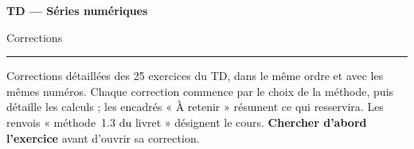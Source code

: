 \documentclass[a4paper,11pt]{article}
\numberwithin{equation}{section}
\numberwithin{figure}{section}
\numberwithin{table}{section}
\theoremstyle{enonce}
\theoremstyle{exemple}
\theoremstyle{remarque}
\begin{document}
\thispagestyle{plain}
{\sffamily\small\color{Gris}}\par\vspace{0.2em}
{\sffamily\bfseries\fontsize{26}{30}\selectfont\color{Ink}TD --- Séries numériques}\par\vspace{0.3em}
{\sffamily\Large\color{BleuMoyen}Corrections}\par\vspace{0.4em}
{\color{Ocre}\rule{3.2cm}{1.4pt}}\par\vspace{0.8em}
{\small Corrections détaillées des 25 exercices du TD, dans le même ordre et avec les mêmes numéros.
Chaque correction commence par le choix de la méthode, puis détaille les calculs ; les encadrés « À retenir » résument ce qui
resservira. Les renvois « méthode~1.3 du livret » désignent le cours.
\textbf{Chercher d'abord l'exercice} avant d'ouvrir sa correction.}
\end{document}
